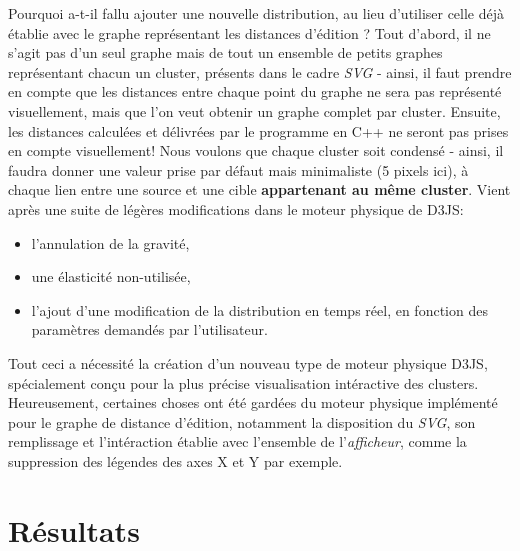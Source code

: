 \documentclass[12pt]{report}
\begin{document}
\begin{spacing}{1.2}
Pourquoi a-t-il fallu ajouter une nouvelle distribution, au lieu d'utiliser celle déjà établie avec le graphe représentant les distances d'édition ?
\newline
Tout d'abord, il ne s'agit pas d'un seul graphe mais de tout un ensemble de petits graphes représentant chacun un cluster, présents dans le cadre \textit{SVG} - ainsi, il faut prendre en compte que les distances entre chaque point du graphe ne sera pas représenté visuellement, mais que l'on veut obtenir un graphe complet par cluster.
\newline
Ensuite, les distances calculées et délivrées par le programme en C++ ne seront pas prises en compte visuellement! Nous voulons que chaque cluster soit condensé - ainsi, il faudra donner une valeur prise par défaut mais minimaliste (5 pixels ici), à chaque lien entre une source et une cible \textbf{appartenant au même cluster}.
\newline
Vient après une suite de légères modifications dans le moteur physique de D3JS:
	\begin{itemize}
	\item{l'annulation de la gravité,}
	\item{une élasticité non-utilisée,}
	\item{l'ajout d'une modification de la distribution en temps réel, en fonction des paramètres demandés par l'utilisateur.}
	\end{itemize}
Tout ceci a nécessité la création d'un nouveau type de moteur physique D3JS, spécialement conçu pour la plus précise visualisation intéractive des clusters.
\newline
Heureusement, certaines choses ont été gardées du moteur physique implémenté pour le graphe de distance d'édition, notamment la disposition du \textit{SVG}, son remplissage et l'intéraction établie avec l'ensemble de l'\textit{afficheur}, comme la suppression des légendes des axes X et Y par exemple.

\section{Résultats}


\end{spacing}
\end{document}
